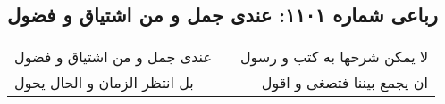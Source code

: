 \begin{center}
\section*{رباعی شماره ۱۱۰۱: عندی جمل و من اشتیاق و فضول}
\label{sec:1101}
\begin{longtable}{l p{0.5cm} r}
عندی جمل و من اشتیاق و فضول
&&
لا یمکن شرحها به کتب و رسول
\\
بل انتظر الزمان و الحال یحول
&&
ان یجمع بیننا فتصغی و اقول
\\
\end{longtable}
\end{center}
